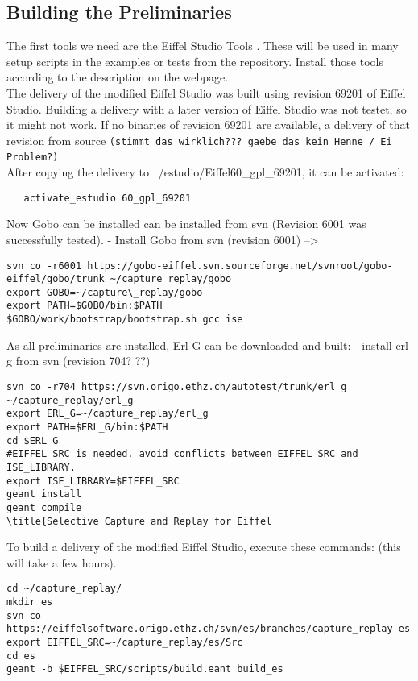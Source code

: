 \subsection{Building the Preliminaries}
The first tools we need are the  Eiffel Studio Tools \cite{estudiotools}. These will be used in many setup scripts in the examples or tests from the repository. Install those tools according to the description on the webpage.\\

The delivery of the modified Eiffel Studio was built using revision 69201 of Eiffel Studio. Building a delivery with a later version of Eiffel Studio was not testet, so it might not work. If no binaries of revision 69201 are available, a delivery of that revision from source \texttt{(stimmt das wirklich??? gaebe das kein Henne / Ei Problem?)}.\\
After copying the delivery to ~/estudio/Eiffel60\_gpl\_69201, it can be activated:
\bashlisting
\begin{lstlisting}
   activate_estudio 60_gpl_69201
\end{lstlisting}

Now Gobo \cite{gobo} can be installed can be installed from svn (Revision 6001 was successfully tested).
- Install Gobo  from svn (revision 6001) -->
\begin{lstlisting}
svn co -r6001 https://gobo-eiffel.svn.sourceforge.net/svnroot/gobo-eiffel/gobo/trunk ~/capture_replay/gobo
export GOBO=~/capture\_replay/gobo
export PATH=$GOBO/bin:$PATH
$GOBO/work/bootstrap/bootstrap.sh gcc ise
\end{lstlisting}

As all preliminaries are installed, Erl-G can be downloaded and built:
- install erl-g \cite{erlg} from svn (revision 704? ??) 
\begin{lstlisting}
svn co -r704 https://svn.origo.ethz.ch/autotest/trunk/erl_g ~/capture_replay/erl_g
export ERL_G=~/capture_replay/erl_g
export PATH=$ERL_G/bin:$PATH
cd $ERL_G
#EIFFEL_SRC is needed. avoid conflicts between EIFFEL_SRC and ISE_LIBRARY.
export ISE_LIBRARY=$EIFFEL_SRC
geant install
geant compile
\title{Selective Capture and Replay for Eiffel
\end{lstlisting}

To build a delivery of the modified Eiffel Studio, execute these commands: (this will take a few hours).
\begin{lstlisting}
cd ~/capture_replay/
mkdir es
svn co https://eiffelsoftware.origo.ethz.ch/svn/es/branches/capture_replay es
export EIFFEL_SRC=~/capture_replay/es/Src
cd es
geant -b $EIFFEL_SRC/scripts/build.eant build_es
\end{lstlisting}

